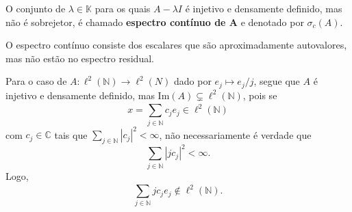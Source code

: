 \documentclass[../functional_analysis.tex]{subfiles}
\begin{document}
\begin{tcolorbox}[
		skin=enhanced,
		title=Lembrete!,
		after title={\hfill Espectro Contínuo},
		fonttitle=\bfseries,
		sharp corners=downhill,
		colframe=black,
		colbacktitle=yellow!75!white,
		colback=yellow!30,
		colbacklower=black,
		coltitle=black,
		drop large lifted shadow
	]
	O conjunto de \(\lambda\in \mathbb{K}\) para os quais \(A-\lambda I\) é injetivo e densamente definido, mas não é sobrejetor, é chamado \textbf{espectro contínuo de A}
	e denotado por \(\sigma_{c}(A)\).

	O espectro contínuo consiste dos escalares que são aproximadamente autovalores, mas não estão no espectro residual.

	Para o caso de \(A:\ell^{2}(\mathbb{N})\rightarrow \ell^{2}(N)\) dado por \(e_{j}\mapsto e_{j}/j\), segue que \(A\) é injetivo e densamente definido, mas \(\mathrm{Im}(A)\subsetneq \ell^{2}(\mathbb{N})\), pois se
	\[
		x=\sum\limits_{j\in \mathbb{N}}^{}c_{j}e_{j}\in \ell^{2}(\mathbb{N})
	\]
	com \(c_{j}\in \mathbb{C}\) tais que \(\sum\limits_{j\in \mathbb{N}}^{}| c_{j} |^{2}<\infty\), não necessariamente é verdade que
	\[
		\sum\limits_{j\in \mathbb{N}}^{}| jc_{j} |^{2}<\infty.
	\]
	Logo,
	\[
		\sum\limits_{j\in \mathbb{N}}^{}jc_{j}e_{j}\not\in \ell^{2}(\mathbb{N}).
	\]
\end{tcolorbox}
\end{document}
